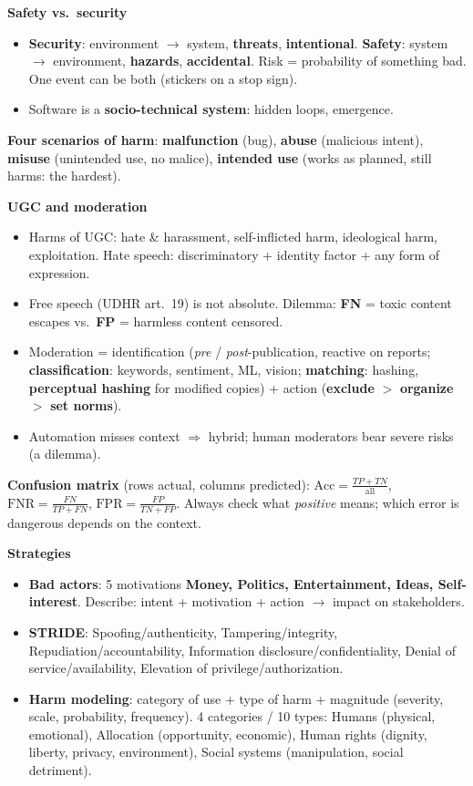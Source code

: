 \documentclass[11pt,a4paper,openany]{book}
\begin{document}
\begin{recapbox}[title={Exam-ready recap --- Safety 1}]
\textbf{Safety vs.\ security}
\begin{itemize}
  \item \textbf{Security}: environment $\to$ system, \textbf{threats}, \textbf{intentional}.
        \textbf{Safety}: system $\to$ environment, \textbf{hazards}, \textbf{accidental}. Risk =
        probability of something bad. One event can be both (stickers on a stop sign).
  \item Software is a \textbf{socio-technical system}: hidden loops, emergence.
\end{itemize}
\textbf{Four scenarios of harm}: \textbf{malfunction} (bug), \textbf{abuse} (malicious intent),
\textbf{misuse} (unintended use, no malice), \textbf{intended use} (works as planned, still
harms: the hardest).

\textbf{UGC and moderation}
\begin{itemize}
  \item Harms of UGC: hate \& harassment, self-inflicted harm, ideological harm, exploitation.
        Hate speech: discriminatory + identity factor + any form of expression.
  \item Free speech (UDHR art.\ 19) is not absolute. Dilemma: \textbf{FN} = toxic content
        escapes vs.\ \textbf{FP} = harmless content censored.
  \item Moderation = identification (\emph{pre} / \emph{post}-publication, reactive on reports;
        \textbf{classification}: keywords, sentiment, ML, vision; \textbf{matching}: hashing,
        \textbf{perceptual hashing} for modified copies) + action (\textbf{exclude} $>$
        \textbf{organize} $>$ \textbf{set norms}).
  \item Automation misses context $\Rightarrow$ hybrid; human moderators bear severe risks
        (a dilemma).
\end{itemize}
\textbf{Confusion matrix} (rows actual, columns predicted): $\text{Acc}=\frac{TP+TN}{\text{all}}$,
$\text{FNR}=\frac{FN}{TP+FN}$, $\text{FPR}=\frac{FP}{TN+FP}$. Always check what
\emph{positive} means; which error is dangerous depends on the context.

\textbf{Strategies}
\begin{itemize}
  \item \textbf{Bad actors}: 5 motivations \textbf{Money, Politics, Entertainment, Ideas,
        Self-interest}. Describe: intent + motivation + action $\to$ impact on stakeholders.
  \item \textbf{STRIDE}: Spoofing/authenticity, Tampering/integrity,
        Repudiation/accountability, Information disclosure/confidentiality, Denial of
        service/availability, Elevation of privilege/authorization.
  \item \textbf{Harm modeling}: category of use + type of harm + magnitude (severity, scale,
        probability, frequency). 4 categories / 10 types: Humans (physical, emotional),
        Allocation (opportunity, economic), Human rights (dignity, liberty, privacy,
        environment), Social systems (manipulation, social detriment).
\end{itemize}
\end{recapbox}
\end{document}
